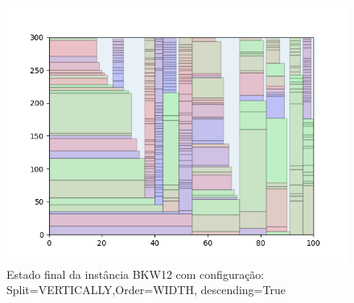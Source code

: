 \begin{figure}[H]
    \centering
    \caption[]{Estado final da instância BKW12 com configuração: Split=VERTICALLY,Order=WIDTH, descending=True}
    \label{fig:bkw12-vertically-width-true}
    \includegraphics[scale=0.5]{output/figures/bkw/bkw12/vertically/width/true/000}
\end{figure}